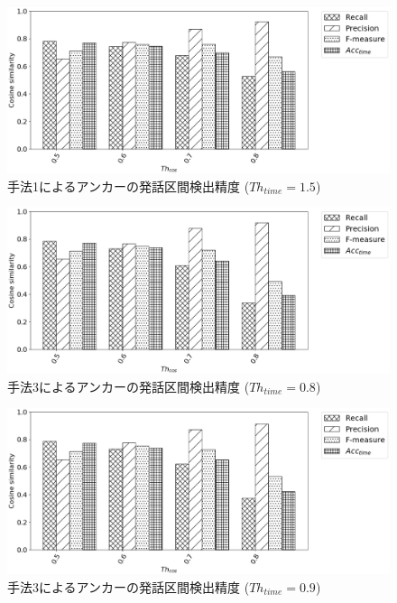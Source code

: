\begin{figure}[H]
  \begin{center}
    \includegraphics[scale=0.5]{./figure/prob1_15.eps}
  \end{center}
  \caption{手法1によるアンカーの発話区間検出精度 ($Th_{time}=1.5$)}
\end{figure}

\begin{figure}[H]
  \begin{center}
    \includegraphics[scale=0.5]{./figure/prob3_08.eps}
  \end{center}
  \caption{手法3によるアンカーの発話区間検出精度 ($Th_{time}=0.8$)}
\end{figure}

\begin{figure}[H]
  \begin{center}
    \includegraphics[scale=0.5]{./figure/prob3_09.eps}
  \end{center}
  \caption{手法3によるアンカーの発話区間検出精度 ($Th_{time}=0.9$)}
\end{figure}

